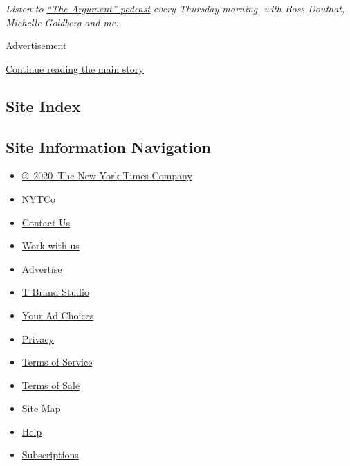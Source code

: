 \emph{Listen to}
\href{https://www.nytimes.com/column/the-argument}{\emph{``The
Argument'' podcast}} \emph{every Thursday morning, with Ross Douthat,
Michelle Goldberg and me.}

Advertisement

\protect\hyperlink{after-bottom}{Continue reading the main story}

\hypertarget{site-index}{%
\subsection{Site Index}\label{site-index}}

\hypertarget{site-information-navigation}{%
\subsection{Site Information
Navigation}\label{site-information-navigation}}

\begin{itemize}
\tightlist
\item
  \href{https://help.nytimes.com/hc/en-us/articles/115014792127-Copyright-notice}{©~2020~The
  New York Times Company}
\end{itemize}

\begin{itemize}
\tightlist
\item
  \href{https://www.nytco.com/}{NYTCo}
\item
  \href{https://help.nytimes.com/hc/en-us/articles/115015385887-Contact-Us}{Contact
  Us}
\item
  \href{https://www.nytco.com/careers/}{Work with us}
\item
  \href{https://nytmediakit.com/}{Advertise}
\item
  \href{http://www.tbrandstudio.com/}{T Brand Studio}
\item
  \href{https://www.nytimes.com/privacy/cookie-policy\#how-do-i-manage-trackers}{Your
  Ad Choices}
\item
  \href{https://www.nytimes.com/privacy}{Privacy}
\item
  \href{https://help.nytimes.com/hc/en-us/articles/115014893428-Terms-of-service}{Terms
  of Service}
\item
  \href{https://help.nytimes.com/hc/en-us/articles/115014893968-Terms-of-sale}{Terms
  of Sale}
\item
  \href{https://spiderbites.nytimes.com}{Site Map}
\item
  \href{https://help.nytimes.com/hc/en-us}{Help}
\item
  \href{https://www.nytimes.com/subscription?campaignId=37WXW}{Subscriptions}
\end{itemize}
